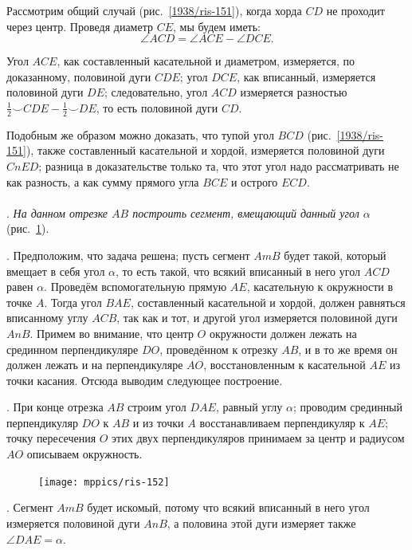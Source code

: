 \documentclass[oneside]{book}
\begin{document}
Рассмотрим общий случай (рис.~\ref{1938/ris-151}), когда хорда $CD$ не проходит через центр.
Проведя диаметр $CE$, мы будем иметь:
\[\angle ACD = \angle ACE - \angle DCE.\]

Угол $ACE$, как составленный касательной и диаметром, измеряется, по доказанному, половиной дуги $CDE$;
угол $DCE$, как вписанный, измеряется половиной дуги $DE$;
следовательно, угол $ACD$ измеряется разностью $\tfrac12{\smallsmile}CDE-\tfrac12{\smallsmile}DE$, то есть половиной дуги $CD$.

Подобным же образом можно доказать, что тупой угол $BCD$ (рис.~\ref{1938/ris-151}), также составленный касательной и хордой, измеряется половиной дуги $CnED$;
разница в доказательстве только та, что этот угол надо рассматривать не как разность, а как сумму прямого угла $BCE$ и острого $ECD$.

\paragraph{}\label{1938/132}
\mbox{.}
\emph{На данном отрезке $AB$ построить сегмент, вмещающий данный угол $\alpha$} (рис.~\ref{1938/ris-152}).

\smallskip
\mbox{.}
Предположим, что задача решена;
пусть сегмент $AmB$ будет такой, который вмещает в себя угол $\alpha$, то есть такой, что всякий вписанный в него угол $ACD$ равен $\alpha$.
Проведём вспомогательную прямую $AE$, касательную к окружности в точке $A$.
Тогда угол $BAE$, составленный касательной и хордой, должен равняться вписанному углу $ACB$, так как и тот, и другой угол измеряется половиной дуги $AnB$.
Примем во внимание, что центр $O$ окружности должен лежать на срединном перпендикуляре $DO$, проведённом к отрезку $AB$, и в то же время он должен лежать и на перпендикуляре $AO$, восстановленным к касательной $AE$ из точки касания.
Отсюда выводим следующее построение.

\smallskip
\mbox{.}
При конце отрезка $AB$ строим угол $DAE$, равный углу $\alpha$;
проводим срединный перпендикуляр $DO$ к $AB$ и из точки $A$ восстанавливаем перпендикуляр к $AE$; 
точку пересечения $O$ этих двух перпендикуляров принимаем за центр и радиусом $AO$ описываем окружность.

\begin{figure}
\centering
\texttt{[image: mppics/ris-152]}
\caption{}\label{1938/ris-152}
\end{figure}

\smallskip
\mbox{.}
Сегмент $AmB$ будет искомый, потому что всякий вписанный в него угол измеряется половиной дуги $AnB$, а половина этой дуги измеряет также $\angle DAE=\alpha$.
\end{document}
